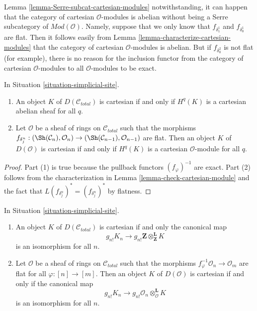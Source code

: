 \begin{remark}[Warning]
\label{remark-warning-cartesian-modules}
Lemma \ref{lemma-Serre-subcat-cartesian-modules} notwithstanding, it
can happen that the category of cartesian $\mathcal{O}$-modules is
abelian without being a Serre subcategory of $\textit{Mod}(\mathcal{O})$.
Namely, suppose that we only know that
$f_{\delta_1^1}$ and $f_{\delta_0^1}$ are flat.
Then it follows easily from
Lemma \ref{lemma-characterize-cartesian-modules}
that the category of cartesian $\mathcal{O}$-modules is abelian.
But if $f_{\delta_0^2}$ is not flat (for example),
there is no reason for the inclusion functor
from the category of cartesian $\mathcal{O}$-modules
to all $\mathcal{O}$-modules to be exact.
\end{remark}

\begin{lemma}
\label{lemma-derived-cartesian-modules}
In Situation \ref{situation-simplicial-site}.
\begin{enumerate}
\item An object $K$ of $D(\mathcal{C}_{total})$ is cartesian if and only
if $H^q(K)$ is a cartesian abelian sheaf for all $q$.
\item Let $\mathcal{O}$ be a sheaf
of rings on $\mathcal{C}_{total}$ such that the morphisms
$f_{\delta^n_j} : (\Sh(\mathcal{C}_n), \mathcal{O}_n)
\to (\Sh(\mathcal{C}_{n - 1}), \mathcal{O}_{n - 1})$ are flat.
Then an object $K$ of $D(\mathcal{O})$ is cartesian if and only
if $H^q(K)$ is a cartesian $\mathcal{O}$-module for all $q$.
\end{enumerate}
\end{lemma}

\begin{proof}
Part (1) is true because the pullback functors $(f_\varphi)^{-1}$
are exact. Part (2) follows from the characterization in
Lemma \ref{lemma-check-cartesian-module}
and the fact that $L(f_{\delta^n_j})^* = (f_{\delta^n_j})^*$
by flatness.
\end{proof}

\begin{lemma}
\label{lemma-derived-cartesian-shriek}
In Situation \ref{situation-simplicial-site}.
\begin{enumerate}
\item An object $K$ of $D(\mathcal{C}_{total})$ is cartesian if and only
the canonical map
$$
g_{n!}K_n \longrightarrow
g_{n!}\mathbf{Z} \otimes^\mathbf{L}_\mathbf{Z} K
$$
is an isomorphism for all $n$.
\item Let $\mathcal{O}$ be a sheaf of rings on $\mathcal{C}_{total}$
such that the morphisms $f_\varphi^{-1}\mathcal{O}_n \to \mathcal{O}_m$
are flat for all $\varphi : [n] \to [m]$. Then an object $K$ of
$D(\mathcal{O})$ is cartesian if and only if the canonical map
$$
g_{n!}K_n \longrightarrow
g_{n!}\mathcal{O}_n \otimes^\mathbf{L}_\mathcal{O} K
$$
is an isomorphism for all $n$.
\end{enumerate}
\end{lemma}

